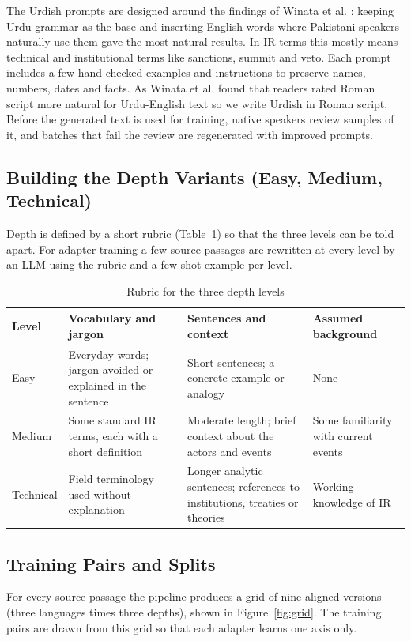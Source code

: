 \documentclass{FastFyp}
\begin{document}
The Urdish prompts are designed around the findings of Winata et al. \cite{winata2026codeswitched}: keeping Urdu grammar as the base and inserting English words where Pakistani speakers naturally use them gave the most natural results. In IR terms this mostly means technical and institutional terms like sanctions, summit and veto. Each prompt includes a few hand checked examples and instructions to preserve names, numbers, dates and facts. As Winata et al. found that readers rated Roman script more natural for Urdu-English text so we write Urdish in Roman script. Before the generated text is used for training, native speakers review samples of it, and batches that fail the review are regenerated with improved prompts. 

\subsection{Building the Depth Variants (Easy, Medium, Technical)}
Depth is defined by a short rubric (Table~\ref{tab:depth}) so that the three levels can be told apart. For adapter training a few source passages are rewritten at every level by an LLM using the rubric and a few-shot example per level.

\begin{table}[!ht]
\centering
\caption{Rubric for the three depth levels}
\label{tab:depth}
\small
\begin{tabular}{|p{1.9cm}|p{4.3cm}|p{4.5cm}|p{3.1cm}|}
\hline
\textbf{Level} & \textbf{Vocabulary and jargon} & \textbf{Sentences and context} & \textbf{Assumed background} \\ \hline
Easy & Everyday words; jargon avoided or explained in the sentence & Short sentences; a concrete example or analogy & None \\ \hline
Medium & Some standard IR terms, each with a short definition & Moderate length; brief context about the actors and events & Some familiarity with current events \\ \hline
Technical & Field terminology used without explanation & Longer analytic sentences; references to institutions, treaties or theories & Working knowledge of IR \\ \hline
\end{tabular}
\end{table}

\subsection{Training Pairs and Splits}
For every source passage the pipeline produces a grid of nine aligned versions (three languages times three depths), shown in Figure~\ref{fig:grid}. The training pairs are drawn from this grid so that each adapter learns one axis only.
\end{document}
